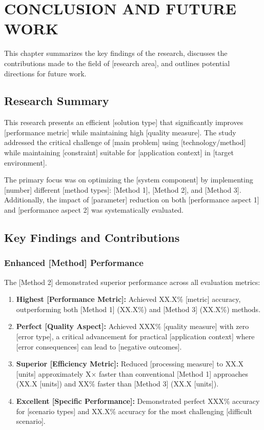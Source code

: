 \chapter{CONCLUSION AND FUTURE WORK}

This chapter summarizes the key findings of the research, discusses the contributions made to the field of [research area], and outlines potential directions for future work.

\section{Research Summary}

This research presents an efficient [solution type] that significantly improves [performance metric] while maintaining high [quality measure]. The study addressed the critical challenge of [main problem] using [technology/method] while maintaining [constraint] suitable for [application context] in [target environment].

The primary focus was on optimizing the [system component] by implementing [number] different [method types]: [Method 1], [Method 2], and [Method 3]. Additionally, the impact of [parameter] reduction on both [performance aspect 1] and [performance aspect 2] was systematically evaluated.

\section{Key Findings and Contributions}

\subsection{Enhanced [Method] Performance}

The [Method 2] demonstrated superior performance across all evaluation metrics:

\begin{enumerate}
\item \textbf{Highest [Performance Metric]:} Achieved XX.X\% [metric] accuracy, outperforming both [Method 1] (XX.X\%) and [Method 3] (XX.X\%) methods.

\item \textbf{Perfect [Quality Aspect]:} Achieved XXX\% [quality measure] with zero [error type], a critical advancement for practical [application context] where [error consequences] can lead to [negative outcomes].

\item \textbf{Superior [Efficiency Metric]:} Reduced [processing measure] to XX.X [units] approximately X× faster than conventional [Method 1] approaches (XX.X [units]) and XX\% faster than [Method 3] (XX.X [units]).

\item \textbf{Excellent [Specific Performance]:} Demonstrated perfect XXX\% accuracy for [scenario types] and XX.X\% accuracy for the most challenging [difficult scenario].
\end{enumerate}

